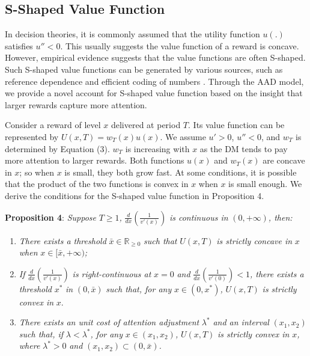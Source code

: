 \documentclass[
  12pt,
]{article}
\begin{document}
\hypertarget{s-shaped-value-function}{%
\subsection{S-Shaped Value Function}\label{s-shaped-value-function}}

In decision theories, it is commonly assumed that the utility function
\(u(.)\) satisfies \(u''<0\). This usually suggests the value function
of a reward is concave. However, empirical evidence suggests that the
value functions are often S-shaped. Such S-shaped value functions can be
generated by various sources, such as reference dependence
\citep{kahneman1979prospect} and efficient coding of numbers
\citep{louie2012efficient}. Through the AAD model, we provide a novel
account for S-shaped value function based on the insight that larger
rewards capture more attention.

Consider a reward of level \(x\) delivered at period \(T\). Its value
function can be represented by \(U(x,T)=w_T(x)u(x)\). We assume
\(u'>0\), \(u''<0\), and \(w_T\) is determined by Equation (3). \(w_T\)
is increasing with \(x\) as the DM tends to pay more attention to larger
rewards. Both functions \(u(x)\) and \(w_T(x)\) are concave in \(x\); so
when \(x\) is small, they both grow fast. At some conditions, it is
possible that the product of the two functions is convex in \(x\) when
\(x\) is small enough. We derive the conditions for the S-shaped value
function in Proposition 4.

\noindent \textbf{Proposition 4}: \emph{Suppose} \(T\geq1\)\emph{,}
\(\frac{d}{dx}\left(\frac{1}{v'(x)}\right)\) \emph{is continuous in}
\((0,+\infty)\)\emph{, then:}

\begin{enumerate}
\def\labelenumi{(\alph{enumi})}
\item
  \emph{There exists a threshold} \(\bar{x} \in\mathbb{R}_{\geq0}\)
  \emph{such that} \(U(x,T)\) \emph{is strictly concave in} \(x\)
  \emph{when} \(x\in [\bar{x},+\infty)\)\emph{;}
\item
  \emph{If} \(\frac{d}{dx}\left(\frac{1}{v'(x)}\right)\) \emph{is
  right-continuous at} \(x=0\) \emph{and}
  \(\frac{d}{dx}\left(\frac{1}{v'(0)}\right)<1\)\emph{, there exists a
  threshold} \(x^*\) \emph{in} \((0, \bar{x})\) \emph{such that, for
  any} \(x\in (0,x^*)\)\emph{,} \(U(x,T)\) \emph{is strictly convex in}
  \(x\).
\item
  \emph{There exists an unit cost of attention adjustment} \(\lambda^*\)
  \emph{and an interval} \((x_1,x_2)\) \emph{such that, if}
  \(\lambda<\lambda^*\)\emph{, for any} \(x\in(x_1,x_2)\)\emph{,}
  \(U(x,T)\) \emph{is strictly convex in} \(x\)\emph{, where}
  \(\lambda^*>0\) \emph{and} \((x_1,x_2)\subset(0,\bar{x})\)\emph{.}
\end{enumerate}
\end{document}

